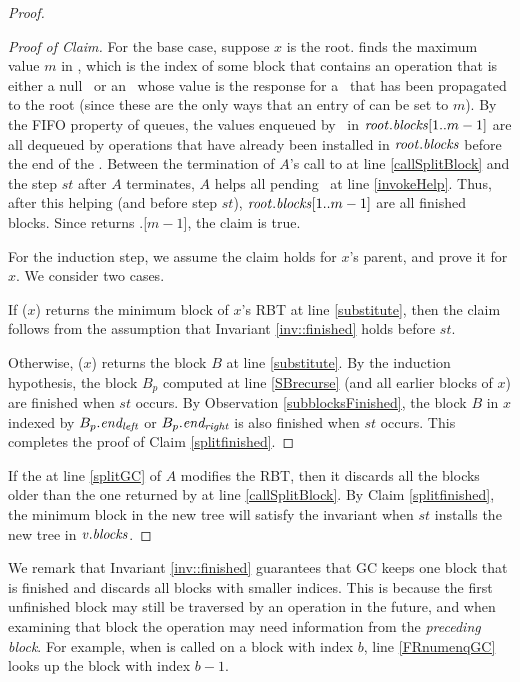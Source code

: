 \begin{proof}
\begin{proof}[Proof of Claim]
For the base case, suppose $x$ is the root.
 finds the maximum value $m$ in , which is the index of some block
that contains an operation that is either a null \dequeue\ or an \enqueue\ whose value is the response for a \dequeue\ that has been propagated to the root (since these are the only ways that an entry of  can be set to $m$).
By the FIFO property of queues, the values enqueued by \enqueues\ in $\mbox{\textnormal{\textit{root}}}.\mbox{\textit{blocks}}[1..m-1]$
are all dequeued by operations that have already been installed in $\mbox{\textnormal{\textit{root}}}.\mbox{\textit{blocks}}$ before
the end of the .
Between the termination of $A$'s call to  at line \ref{callSplitBlock}
and the  step $st$ after $A$ terminates,  $A$ helps all pending \dequeues\ at line \ref{invokeHelp}.
Thus, after this helping (and before step $st$),
$\mbox{\textnormal{\textit{root}}}.\mbox{\textit{blocks}}[1..m-1]$ are all finished blocks.
Since  returns .[$m-1$], the claim is true.

For the induction step, we assume the claim holds for $x$'s parent, and prove it for $x$.
We consider two cases.

If ($x$) returns the minimum block of $x$'s RBT at line \ref{substitute},
then the claim follows from the assumption that Invariant \ref{inv::finished} holds before $st$.

Otherwise, ($x$) returns the block $B$ at line \ref{substitute}.
By the induction hypothesis, the block $B_p$ computed at line \ref{SBrecurse}
(and all earlier blocks of $x$) are finished when $st$ occurs.
By Observation \ref{subblocksFinished}, the block $B$ in $x$ indexed by $B_p.\mbox{\textit{end\textsubscript{left}}}$ or $B_p.\mbox{\textit{end\textsubscript{right}}}$
is also finished when $st$ occurs.  This completes the proof of Claim \ref{splitfinished}.
\renewcommand{\qedsymbol}{$\diamondsuit$}
\end{proof}

If the  at line \ref{splitGC} of $A$ modifies the RBT, then it discards
all the blocks older than the one returned by  at line \ref{callSplitBlock}.
By Claim \ref{splitfinished}, the minimum block in the new tree will satisfy the invariant when $st$
installs the new tree in $\mbox{\textnormal{\textit{v}}}.\mbox{\textit{blocks}}$.
\end{proof}

We remark that Invariant \ref{inv::finished} guarantees that GC keeps one block that is finished and discards all blocks with smaller indices.
This is because the first unfinished block may still be traversed by an operation in the future,
and when examining that block the operation may need information from the \emph{preceding block}.  For example,
when  is called on a block with index $b$, line \ref{FRnumenqGC} looks up the block with
index $b-1$.


